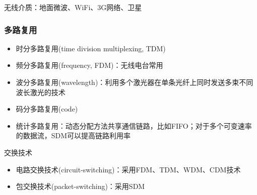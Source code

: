 无线介质：地面微波、WiFi、3G网络、卫星

\subsubsection{多路复用}
\begin{itemize}
	\item 时分多路复用(time division multiplexing, TDM)
	\item 频分多路复用(frequency, FDM)：无线电台常用
	\item 波分多路复用(wavelength)：利用多个激光器在单条光纤上同时发送多束不同波长激光的技术
	\item 码分多路复用(code)
	\item 统计多路复用：动态分配方法共享通信链路，比如FIFO；对于多个可变速率的数据流，SDM可以提高链路利用率
\end{itemize}

交换技术
\begin{itemize}
	\item 电路交换技术(circuit-switching)：采用FDM、TDM、WDM、CDM技术
	\item 包交换技术(packet-switching)：采用SDM
\end{itemize}